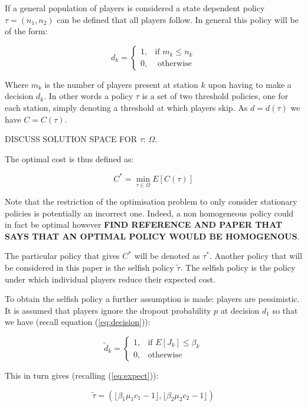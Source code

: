 \documentclass[12pt]{article}
\begin{document}
If a general population of players is considered a state dependent policy $\tau = (n_1, n_2)$ can be defined that all players follow.
In general this policy will be of the form:

$$d_k = \begin{cases}
1,& \text{if }m_k\leq n_k\\
0,&\text{ otherwise}
\end{cases}$$

Where $m_k$ is the number of players present at station $k$ upon having to make a decision $d_k$.
In other words a policy $\tau$ is a set of two threshold policies, one for each station, simply denoting a threshold at which players skip.
As $d=d(\tau)$ we have $C=C(\tau)$.

DISCUSS SOLUTION SPACE FOR $\tau$: $\Omega$.

The optimal cost is thus defined as:

\begin{equation}\label{eq:optimal}
C^*=\min_{\tau\in\Omega}E[C(\tau)]
\end{equation}

Note that the restriction of the optimisation problem to only consider stationary policies is potentially an incorrect one.
Indeed, a non homogeneous policy could in fact be optimal however \textbf{FIND REFERENCE AND PAPER THAT SAYS THAT AN OPTIMAL POLICY WOULD BE HOMOGENOUS}.

The particular policy that gives $C^*$ will be denoted as $\tau^*$.
Another policy that will be considered in this paper is the selfish policy $\tilde\tau$.
The selfish policy is the policy under which individual players reduce their expected cost.

To obtain the selfish policy a further assumption is made: players are pessimistic.
It is assumed that players ignore the dropout probability $p$ at decision $d_1$ so that we have (recall equation (\ref{eq:decision})):

\begin{equation}\label{eq:selfishdecision}
    \tilde d_k=
\begin{cases}
    1,& \text{if } E[J_k] \leq \beta_k \\
    0,& \text{otherwise}
\end{cases}
\end{equation}

This in turn gives (recalling (\ref{eq:expect})):

\begin{equation}\label{eq:selfishpolicy}
\tilde\tau = \left(\lfloor\beta_1\mu_1 c_1 - 1\rfloor,\lfloor\beta_2\mu_2 c_2 - 1\rfloor\right)
\end{equation}
\end{document}
